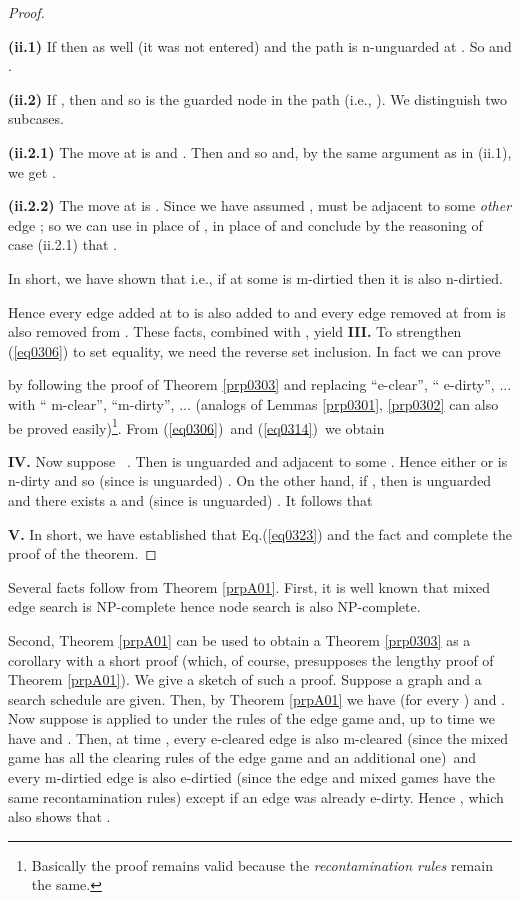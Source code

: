 \documentclass[11pt]{article}\usepackage{amsmath}
\begin{document}
\begin{proof}
\begin{enumerate}
\textbf{(ii.1)} If  then  as well (it was not entered) and the path
 is n-unguarded at . So  and .

\textbf{(ii.2)} If , then  and so  is the guarded node in the path
 (i.e., ). We distinguish two subcases.

\textbf{(ii.2.1)} The move at  is  and . Then  and so  and, by the same argument as in (ii.1), we get
.

\textbf{(ii.2.2)} The move at  is . Since we
have assumed ,  must be adjacent to some \emph{other} edge
 ;
so we can use  in place of ,  in place of
 and conclude by the reasoning of case (ii.2.1) that . \medskip

\qquad In short, we have shown that
i.e., if at  some  is m-dirtied then it is also n-dirtied.
\end{enumerate}

Hence every edge added at  to  is also added
to  and every edge removed at  from
 is also removed from . These facts, combined with , yield
\noindent\textbf{III.} To strengthen (\ref{eq0306}) to set equality, we need
the reverse set inclusion. In fact we can prove

by following the proof of Theorem \ref{prp0303} and replacing
\textquotedblleft e-clear\textquotedblright, \textquotedblleft
e-dirty\textquotedblright, ... with \textquotedblleft
m-clear\textquotedblright, \textquotedblleft m-dirty\textquotedblright, ...
(analogs of Lemmas \ref{prp0301}, \ref{prp0302} can also be proved
easily)\footnote{Basically the proof remains valid because the
\emph{recontamination rules} remain the same.}. From (\ref{eq0306})\ and
(\ref{eq0314})\ we obtain

\noindent\textbf{IV.} Now suppose \ . Then
 is unguarded and adjacent to some . Hence either  or  is n-dirty and so
(since  is unguarded) . On the other
hand, if , then  is unguarded and there
exists a 
and (since  is unguarded) . It follows
that

\noindent\textbf{V.} In short, we have established that
Eq.(\ref{eq0323}) and the fact  and 
complete the proof of the theorem.
\end{proof}

Several facts follow from Theorem \ref{prpA01}. First, it is well known that
mixed edge search is NP-complete \cite{Ellis} hence node search is also NP-complete.

Second, Theorem \ref{prpA01} can be used to obtain a Theorem \ref{prp0303} as
a corollary with a short proof (which, of course, presupposes the lengthy
proof of Theorem \ref{prpA01}). We give a sketch of such a proof. Suppose a
graph  and a search schedule  are given. Then, by
Theorem \ref{prpA01} we have (for every )  and . Now suppose  is applied to 
under the rules of the edge game and, up to time  we have  and . Then, at time , every
e-cleared edge is also m-cleared (since the mixed game has all the clearing
rules of the edge game and an additional one)\ and every m-dirtied edge is
also e-dirtied (since the edge and mixed games have the same recontamination
rules) except if an edge was already e-dirty. Hence , which also shows that
.
\end{document}
